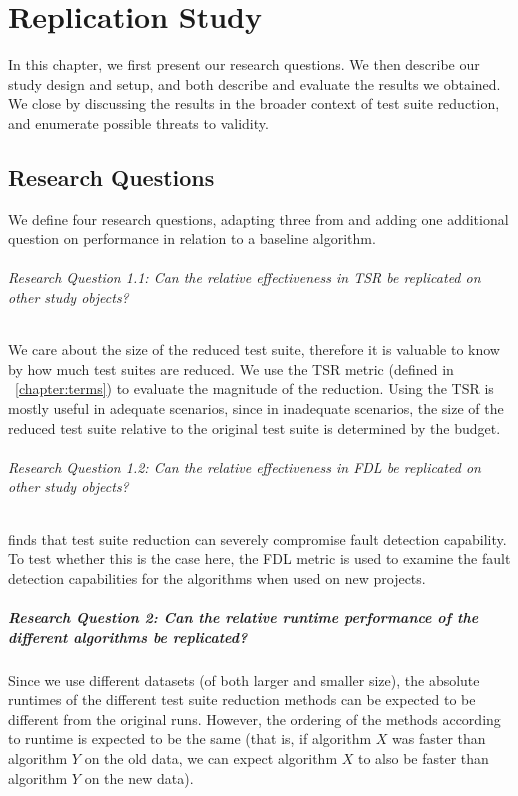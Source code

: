 
\chapter{Replication Study}\label{chapter:replication_study}

In this chapter, we first present our research questions. We then describe
our study design and setup, and both describe and evaluate the results
we obtained. We close by discussing the results in the broader context
of test suite reduction, and enumerate possible threats to validity.

\section{Research Questions}

We define four research questions, adapting three from
\cite{cruciani2019scalable} and adding one additional question on
performance in relation to a baseline algorithm.

\subparagraph{Research Question 1.1: Can the relative effectiveness in TSR be replicated on other study objects?}

We care about the size of the reduced test suite, therefore it is
valuable to know by how much test suites are reduced. We use the TSR
metric (defined in ~\ref{chapter:terms}) to evaluate the magnitude of
the reduction.  Using the TSR is mostly useful in adequate scenarios,
since in inadequate scenarios, the size of the reduced test suite relative
to the original test suite is determined by the budget.

\subparagraph{Research Question 1.2: Can the relative effectiveness in FDL be replicated on other study objects?}

\cite{rothermel2002empirical} finds that test suite reduction can severely
compromise fault detection capability. To test whether this is the case
here, the FDL metric is used to examine the fault detection capabilities
for the algorithms when used on new projects.

\paragraph{Research Question 2: Can the relative runtime performance of the different algorithms be replicated?}

Since we use different datasets (of both larger and smaller size), the
absolute runtimes of the different test suite reduction methods can be
expected to be different from the original runs. However, the ordering of
the methods according to runtime is expected to be the same (that is, if
algorithm $X$ was faster than algorithm $Y$ on the old data, we can expect
algorithm $X$ to also be faster than algorithm $Y$ on the new data).

